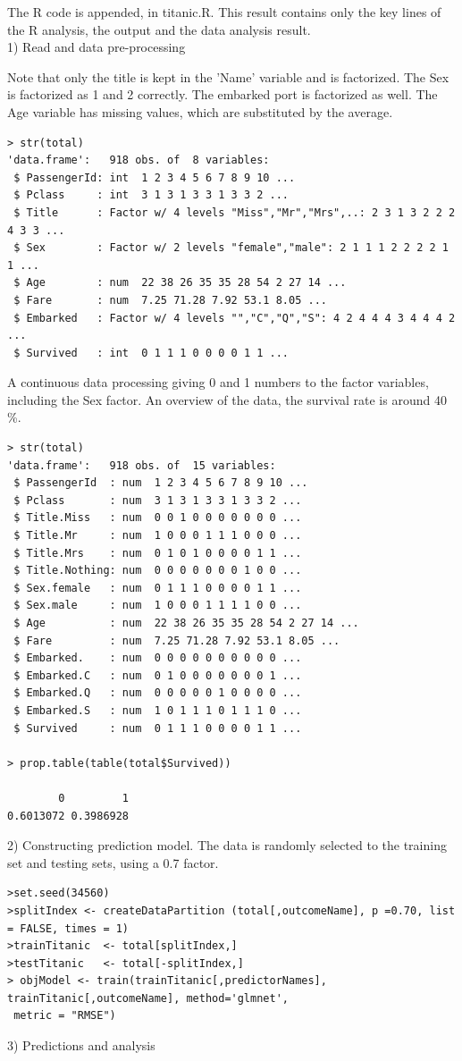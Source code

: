 \documentclass[11pt]{article}
\begin{document}
The R code is appended, in titanic.R. This result contains only the key lines of the R analysis, the output and the data analysis result. \\
1) Read and data pre-processing 

Note that only the title is kept in the 'Name' variable and is factorized. The Sex is factorized as 1 and 2 correctly. The embarked port is factorized as well. The Age variable has missing values, which are substituted by the average. 

\begin{verbatim}
> str(total)
'data.frame':	918 obs. of  8 variables:
 $ PassengerId: int  1 2 3 4 5 6 7 8 9 10 ...
 $ Pclass     : int  3 1 3 1 3 3 1 3 3 2 ...
 $ Title      : Factor w/ 4 levels "Miss","Mr","Mrs",..: 2 3 1 3 2 2 2 4 3 3 ...
 $ Sex        : Factor w/ 2 levels "female","male": 2 1 1 1 2 2 2 2 1 1 ...
 $ Age        : num  22 38 26 35 35 28 54 2 27 14 ...
 $ Fare       : num  7.25 71.28 7.92 53.1 8.05 ...
 $ Embarked   : Factor w/ 4 levels "","C","Q","S": 4 2 4 4 4 3 4 4 4 2 ...
 $ Survived   : int  0 1 1 1 0 0 0 0 1 1 ...
\end{verbatim}

A continuous data processing giving 0 and 1 numbers to the factor variables, including the Sex factor. 
An overview of the data, the survival rate is around 40 \%.

\begin{verbatim}
> str(total)
'data.frame':	918 obs. of  15 variables:
 $ PassengerId  : num  1 2 3 4 5 6 7 8 9 10 ...
 $ Pclass       : num  3 1 3 1 3 3 1 3 3 2 ...
 $ Title.Miss   : num  0 0 1 0 0 0 0 0 0 0 ...
 $ Title.Mr     : num  1 0 0 0 1 1 1 0 0 0 ...
 $ Title.Mrs    : num  0 1 0 1 0 0 0 0 1 1 ...
 $ Title.Nothing: num  0 0 0 0 0 0 0 1 0 0 ...
 $ Sex.female   : num  0 1 1 1 0 0 0 0 1 1 ...
 $ Sex.male     : num  1 0 0 0 1 1 1 1 0 0 ...
 $ Age          : num  22 38 26 35 35 28 54 2 27 14 ...
 $ Fare         : num  7.25 71.28 7.92 53.1 8.05 ...
 $ Embarked.    : num  0 0 0 0 0 0 0 0 0 0 ...
 $ Embarked.C   : num  0 1 0 0 0 0 0 0 0 1 ...
 $ Embarked.Q   : num  0 0 0 0 0 1 0 0 0 0 ...
 $ Embarked.S   : num  1 0 1 1 1 0 1 1 1 0 ...
 $ Survived     : num  0 1 1 1 0 0 0 0 1 1 ...

> prop.table(table(total$Survived))

        0         1 
0.6013072 0.3986928 
\end{verbatim}
2) 
Constructing prediction model. The data is randomly selected to the training set and testing sets, using a 0.7 factor. 
\begin{verbatim}
>set.seed(34560)
>splitIndex <- createDataPartition (total[,outcomeName], p =0.70, list = FALSE, times = 1)
>trainTitanic  <- total[splitIndex,]
>testTitanic   <- total[-splitIndex,]
> objModel <- train(trainTitanic[,predictorNames], trainTitanic[,outcomeName], method='glmnet', 
 metric = "RMSE")

\end{verbatim}
3) Predictions and analysis
\end{document}
